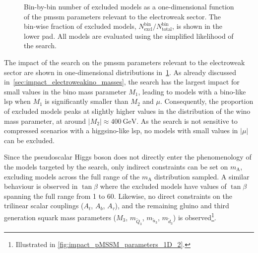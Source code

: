 \begin{figure}
\begin{subfigure}[b]{0.5\linewidth}
	\end{subfigure}\hfill
	\caption{Bin-by-bin number of excluded models as a one-dimensional function of the \gls{pmssm} parameters relevant to the electroweak sector. The bin-wise fraction of excluded models, $N^\mathrm{bin}_\mathrm{excl} / N^\mathrm{bin}_\mathrm{total}$, is shown in the lower pad. All models are evaluated using the simplified likelihood of the \onelepton search.}
	\label{fig:impact_pMSSM_parameters_1D}
\end{figure}

The impact of the \onelepton search on the \gls{pmssm} parameters relevant to the electroweak sector are shown in one-dimensional distributions in~\cref{fig:impact_pMSSM_parameters_1D}. As already discussed in~\cref{sec:impact_electroweakino_masses}, the \onelepton search has the largest impact for small values in the bino mass parameter $M_1$, leading to models with a bino-like \gls{lsp} when $M_1$ is significantly smaller than $M_2$ and $\mu$.
Consequently, the proportion of excluded models peaks at slightly higher values in the distribution of the wino mass parameter, \ie at around $\vert M_2\vert\approx\SI{400}{\GeV}$. As the search is not sensitive to compressed scenarios with a higgsino-like \gls{lsp}, no models with small values in $\vert\mu\vert$ can be excluded. 

Since the pseudoscalar Higgs boson does not directly enter the phenomenology of the models targeted by the \onelepton search, only indirect constraints can be set on $m_\mathrm{A}$, excluding models across the full range of the $m_\mathrm{A}$ distribution sampled.
A similar behaviour is observed in $\tan\beta$ where the excluded models have values of $\tan\beta$ spanning the full range from 1 to 60.
Likewise, no direct constraints on the trilinear scalar couplings ($A_t$, $A_b$, $A_\tau$), and the remaining gluino and third generation squark mass parameters ($M_3$, $m_{\tilde{Q}_3}$, $m_{\tilde{u}_3}$, $m_{\tilde{d}_3}$) is observed\footnote{Illustrated in \cref{fig:impact_pMSSM_parameters_1D_2}.}. 



